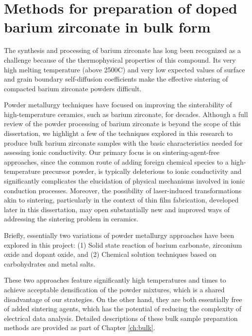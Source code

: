 \section{Methods for preparation of doped barium zirconate in bulk form}
The synthesis and processing of barium zirconate has long been recognized as a challenge because of the thermophysical properties of this compound. Its very high melting temperature (above 2500\textdegree C) and very low expected values of surface and grain boundary self-diffusion coefficients make the effective sintering of compacted barium zirconate powders difficult.

Powder metallurgy techniques have focused on improving the sinterability of high-temperature ceramics, such as barium zirconate, for decades. Although a full review of the powder processing of barium zirconate is beyond the scope of this dissertation, we highlight a few of the techniques explored in this research to produce bulk barium zirconate samples with the basic characteristics needed for assessing ionic conductivity. Our primary focus is on sintering-agent-free approaches, since the common route of adding foreign chemical species to a high-temperature precursor powder, is typically deleterious to ionic conductivity and significantly complicates the elucidation of physical mechanisms involved in ionic conduction processes. Moreover, the possibility of laser-induced transformations akin to sintering, particularly in the context of thin film fabrication, developed later in this dissertation, may open substantially new and improved ways of addressing the sintering problem in ceramics.

Briefly, essentially two variations of powder metallurgy approaches have been explored in this project:  (1) Solid state reaction of barium carbonate, zirconium oxide and dopant oxide, and (2) Chemical solution techniques based on carbohydrates and metal salts.

These two approaches feature significantly high temperatures and times to achieve acceptable densification of the powder mixtures, which is a shared disadvantage of our strategies. On the other hand, they are both essentially free of added sintering agents, which has the potential of reducing the complexity of electrical data analysis. Detailed descriptions of these bulk sample preparation methods are provided as part of Chapter \ref{ch:bulk}. 